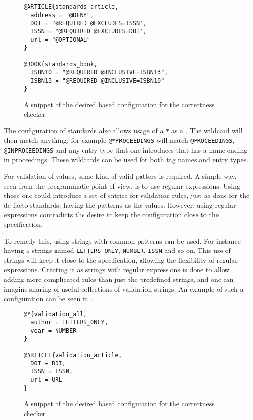 \begin{figure}
  \centering
\begin{verbatim}
@ARTICLE{standards_article,
  address = "@DENY",
  DOI = "@REQUIRED @EXCLUDES=ISSN",
  ISSN = "@REQUIRED @EXCLUDES=DOI",
  url = "@OPTIONAL"
}

@BOOK{standards_book,
  ISBN10 = "@REQUIRED @INCLUSIVE=ISBN13",
  ISBN13 = "@REQUIRED @INCLUSIVE=ISBN10"
}
\end{verbatim}
  \caption{A snippet of the desired {\bibtex} based configuration for
    the correctness checker}
  \label{fig:analyzing_standards_config}
\end{figure}

The configuration of standards also allows usage of a \texttt{*} as a
.  The wildcard will then match anything, for example
\texttt{@*PROCEEDINGS} will match \texttt{@PROCEEDINGS},
\texttt{@INPROCEEDINGS} and any entry type that one introduces that has
a name ending in proceedings.  These wildcards can be used for both
tag names and entry types.

For validation of values, some kind of valid patters is required.  A
simple way, seen from the programmatic point of view, is to use
regular expressions.  Using those one could introduce a set of entries
for validation rules, just as done for the de-facto standards, having
the patterns as the values.  However, using regular expressions
contradicts the desire to keep the configuration close to the
{\bibtex} specification.

To remedy this, using strings with common patterns can be used.  For
instance having a strings named \texttt{LETTERS\_ONLY},
\texttt{NUMBER}, \texttt{ISSN} and so on.  This use of strings will
keep it close to the {\bibtex} specification, allowing the flexibility
of regular expressions.  Creating it as strings with regular
expressions is done to allow adding more complicated rules than just
the predefined strings, and one can imagine sharing of useful
collections of validation strings.  An example of such a configuration
can be seen in .

\begin{figure}
  \centering
\begin{verbatim}
@*{validation_all,
  author = LETTERS_ONLY,
  year = NUMBER
}

@ARTICLE{validation_article,
  DOI = DOI,
  ISSN = ISSN,
  url = URL
}
\end{verbatim}
  \caption{A snippet of the desired {\bibtex} based configuration for
    the correctness checker}
  \label{fig:analyzing_validation_config}
\end{figure}

